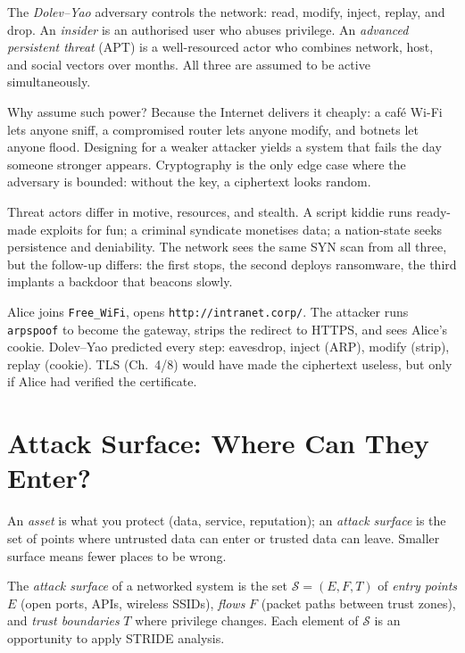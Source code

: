 \begin{definition}\label{def:adversary}
The \emph{Dolev--Yao} adversary controls the network: read, modify, inject,
replay, and drop. An \emph{insider} is an authorised user who abuses privilege.
An \emph{advanced persistent threat} (APT) is a well-resourced actor who
combines network, host, and social vectors over months. All three are
assumed to be active simultaneously.
\end{definition}

Why assume such power? Because the Internet delivers it cheaply: a café Wi-Fi
lets anyone sniff, a compromised router lets anyone modify, and botnets let
anyone flood. Designing for a weaker attacker yields a system that fails the
day someone stronger appears. Cryptography is the only edge case where the
adversary is bounded: without the key, a ciphertext looks random.

Threat actors differ in motive, resources, and stealth. A script kiddie runs
ready-made exploits for fun; a criminal syndicate monetises data; a
nation-state seeks persistence and deniability. The network sees the same
SYN scan from all three, but the follow-up differs: the first stops, the
second deploys ransomware, the third implants a backdoor that beacons slowly.

\begin{example}\label{ex:cafe}
Alice joins \texttt{Free\_WiFi}, opens \texttt{http://intranet.corp/}. The
attacker runs \texttt{arpspoof} to become the gateway, strips the redirect to
HTTPS, and sees Alice's cookie. Dolev--Yao predicted every step: eavesdrop,
inject (ARP), modify (strip), replay (cookie). TLS (Ch.~4/8) would have made
the ciphertext useless, but only if Alice had verified the certificate.
\end{example}

\section{Attack Surface: Where Can They Enter?}\label{sec:surface}
An \emph{asset} is what you protect (data, service, reputation); an
\emph{attack surface} is the set of points where untrusted data can enter or
trusted data can leave. Smaller surface means fewer places to be wrong.

\begin{definition}\label{def:surface}
The \emph{attack surface} of a networked system is the set
$\mathcal{S}= (E,F,T)$ of \emph{entry points} $E$ (open ports, APIs, wireless
SSIDs), \emph{flows} $F$ (packet paths between trust zones), and \emph{trust
boundaries} $T$ where privilege changes. Each element of $\mathcal{S}$ is an
opportunity to apply STRIDE analysis.
\end{definition}

